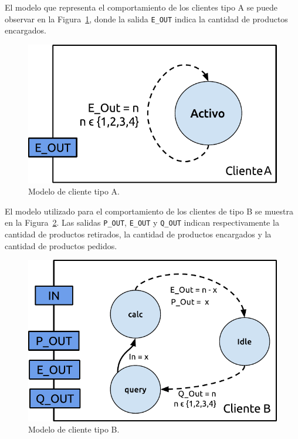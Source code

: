 \documentclass[10pt]{article}
\begin{document}
El modelo que representa el comportamiento de los clientes tipo A se puede observar en la Figura~\ref{fig:fig2}, donde la salida \texttt{E\_OUT} indica la cantidad de productos encargados.

\begin{figure}[h]
\centering
\includegraphics[scale=1]{img/figura2}
\caption{Modelo de cliente tipo A.}
\label{fig:fig2}
\end{figure}

El modelo utilizado para el comportamiento de los clientes de tipo B se muestra en la Figura~\ref{fig:fig3}. Las salidas \texttt{P\_OUT}, \texttt{E\_OUT} y \texttt{Q\_OUT} indican respectivamente la cantidad de productos retirados, la cantidad de productos encargados y la cantidad de productos pedidos.

\begin{figure}[H]
\centering
\includegraphics[scale=1]{img/figura3}
\caption{Modelo de cliente tipo B.}
\label{fig:fig3}
\end{figure}
\end{document}
